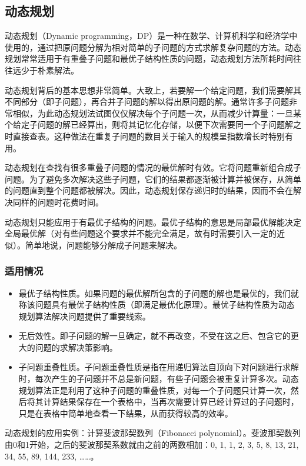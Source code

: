 \documentclass[11pt,a4paper,twoside]{book}
\begin{document}
\subsection{动态规划}
动态规划（Dynamic programming，DP）是一种在数学、计算机科学和经济学中使用的，通过把原问题分解为相对简单的子问题的方式求解复杂问题的方法。动态规划常常适用于有重叠子问题和最优子结构性质的问题，动态规划方法所耗时间往往远少于朴素解法。

动态规划背后的基本思想非常简单。大致上，若要解一个给定问题，我们需要解其不同部分（即子问题），再合并子问题的解以得出原问题的解。通常许多子问题非常相似，为此动态规划法试图仅仅解决每个子问题一次，从而减少计算量：一旦某个给定子问题的解已经算出，则将其记忆化存储，以便下次需要同一个子问题解之时直接查表。这种做法在重复子问题的数目关于输入的规模呈指数增长时特别有用。

动态规划在查找有很多重叠子问题的情况的最优解时有效。它将问题重新组合成子问题。为了避免多次解决这些子问题，它们的结果都逐渐被计算并被保存，从简单的问题直到整个问题都被解决。因此，动态规划保存递归时的结果，因而不会在解决同样的问题时花费时间。

动态规划只能应用于有最优子结构的问题。最优子结构的意思是局部最优解能决定全局最优解（对有些问题这个要求并不能完全满足，故有时需要引入一定的近似）。简单地说，问题能够分解成子问题来解决。
\subsubsection{适用情况}
\begin{itemize}
  \item 最优子结构性质。如果问题的最优解所包含的子问题的解也是最优的，我们就称该问题具有最优子结构性质（即满足最优化原理）。最优子结构性质为动态规划算法解决问题提供了重要线索。
  \item 无后效性。即子问题的解一旦确定，就不再改变，不受在这之后、包含它的更大的问题的求解决策影响。
  \item 子问题重叠性质。子问题重叠性质是指在用递归算法自顶向下对问题进行求解时，每次产生的子问题并不总是新问题，有些子问题会被重复计算多次。动态规划算法正是利用了这种子问题的重叠性质，对每一个子问题只计算一次，然后将其计算结果保存在一个表格中，当再次需要计算已经计算过的子问题时，只是在表格中简单地查看一下结果，从而获得较高的效率。
\end{itemize}

动态规划的应用实例：计算斐波那契数列（Fibonacci polynomial）。斐波那契数列由0和1开始，之后的斐波那契系数就由之前的两数相加：0, 1, 1, 2, 3, 5, 8, 13, 21, 34, 55, 89, 144, 233, ……。
\end{document}
